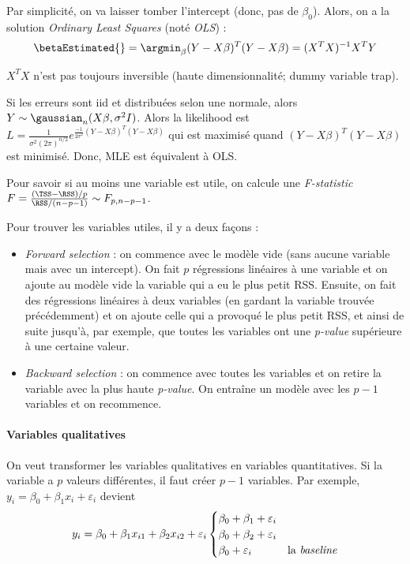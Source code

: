         Par simplicité, on va laisser tomber l'intercept (donc, pas de \(\beta_0\)). Alors, on a la solution \textit{Ordinary Least Squares} (noté \textit{OLS}) :
        \[
            \betaEstimated{} = \argmin_\beta (Y - X\beta)^T(Y - X\beta) = (X^TX)^{-1}X^TY
        \]

        \begin{remarque}
            \(X^TX\) n'est pas toujours inversible (haute dimensionnalité; dummy variable trap).
        \end{remarque}

        Si les erreurs sont iid et distribuées selon une normale, alors \(Y \sim \gaussian_n(X\beta, \sigma^2I)\). Alors la likelihood est \(L = \frac{1}{\sigma^2 (2\pi)^{n/2}}e^{\frac{-1}{2\sigma^2}(Y - X\beta)^T(Y - X\beta)}\) qui est maximisé quand \((Y - X\beta)^T(Y - X\beta)\) est minimisé. Donc, MLE est équivalent à OLS.

        Pour savoir si au moins une variable est utile, on calcule une \textit{F-statistic} \(F = \frac{(\TSS - \RSS)/p}{\RSS/(n-p-1)} \sim F_{p,n-p-1}\).

        Pour trouver les variables utiles, il y a deux façons :
        \begin{itemize}
            \item \textit{Forward selection} : on commence avec le modèle vide (sans aucune variable mais avec un intercept). On fait \(p\) régressions linéaires à une variable et on ajoute au modèle vide la variable qui a eu le plus petit RSS. Ensuite, on fait des régressions linéaires à deux variables (en gardant la variable trouvée précédemment) et on ajoute celle qui a provoqué le plus petit RSS, et ainsi de suite jusqu'à, par exemple, que toutes les variables ont une \textit{p-value} supérieure à une certaine valeur.
            \item \textit{Backward selection} : on commence avec toutes les variables et on retire la variable avec la plus haute \textit{p-value}. On entraîne un modèle avec les \(p - 1\) variables et on recommence.
        \end{itemize}

        \paragraph{Variables qualitatives}
        On veut transformer les variables qualitatives en variables quantitatives. Si la variable a \(p\) valeurs différentes, il faut créer \(p - 1\) variables. Par exemple, \(y_i = \beta_0 + \beta_1 x_i + \varepsilon_i\) devient \[y_i = \beta_0 + \beta_1 x_{i1} + \beta_2 x_{i2} + \varepsilon_i \begin{cases}
            \beta_0 + \beta_1 + \varepsilon_i\\
            \beta_0 + \beta_2 + \varepsilon_i\\
            \beta_0 + \varepsilon_i & \text{la \textit{baseline}\index{Baseline}}\\
        \end{cases}\]

